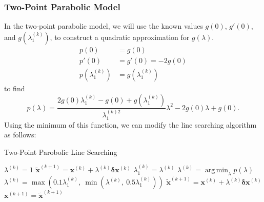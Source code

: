 \documentclass{article}
\DeclareMathOperator{\argmin}{arg\, min}
\begin{document}
\subsubsection{Two-Point Parabolic Model}
In the two-point parabolic model, we will use the known values
\(g\left( 0 \right)\), \(g'\left( 0 \right)\), and \(g\left(
\lambda_1^{\left( k \right)} \right)\), to construct a quadratic
approximation for \(g\left( \lambda \right)\).
\begin{align*}
    p\left( 0 \right)                            & = g\left( 0 \right)                            \\
    p'\left( 0 \right)                           & = g'\left( 0 \right) = -2 g\left( 0 \right)    \\
    p\left( \lambda_1^{\left( k \right)} \right) & = g\left( \lambda_1^{\left( k \right)} \right)
\end{align*}
to find
\begin{equation*}
    p\left( \lambda \right) = \frac{2 g\left( 0 \right) \lambda_1^{\left( k \right)} - g\left( 0 \right) + g\left( \lambda_1^{\left( k \right)} \right)}{\lambda_1^{\left( k \right)2}} \lambda^2 - 2g\left( 0 \right) \lambda + g\left( 0 \right).
\end{equation*}
Using the minimum of this function, we can modify the line searching
algorithm as follows:
\begin{algorithm}[H]
    \caption{Two-Point Parobolic Line Searching}
    \begin{algorithmic}
        \State \(\lambda^{\left( k \right)} = 1\)
        \State \(\tilde{\symbf{x}}^{\left( k + 1 \right)} = \symbf{x}^{\left( k \right)} + \lambda^{\left( k \right)} \symbf{\delta} \symbf{x}^{\left( k \right)}\) 
        \State \(\lambda_1^{\left( k \right)} = \lambda^{\left( k \right)}\)
        \State \(\lambda^{\left( k \right)} = \argmin_{\lambda} p\left( \lambda \right)\)
        \State \(\lambda^{\left( k \right)} = \max{\left( 0.1 \lambda_1^{\left( k \right)},\: \min{\left( \lambda^{\left( k \right)},\: 0.5 \lambda_1^{\left( k \right)} \right)} \right)}\) 
        \State \(\tilde{\symbf{x}}^{\left( k+1 \right)} = \symbf{x}^{\left( k \right)} + \lambda^{\left( k \right)} \symbf{\delta}{\symbf{x}}^{\left( k \right)}\)
        \EndWhile
        \State \(\symbf{x}^{\left( k+1 \right)} = \tilde{\symbf{x}}^{\left( k+1 \right)}\)
    \end{algorithmic}
\end{algorithm}
\end{document}
